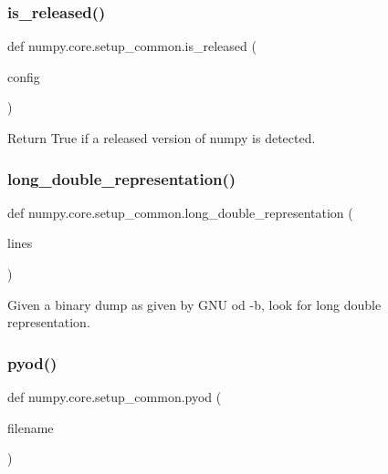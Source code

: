 \subsubsection{\texorpdfstring{is\+\_\+released()}{is\_released()}}
{\footnotesize\ttfamily def numpy.\+core.\+setup\+\_\+common.\+is\+\_\+released (\begin{DoxyParamCaption}\item[{}]{config }\end{DoxyParamCaption})}

\begin{DoxyVerb}Return True if a released version of numpy is detected.\end{DoxyVerb}
 \mbox{\label{namespacenumpy_1_1core_1_1setup__common_ae7eb2d6700eb4a26ef4b33012b9e2457}} 
\subsubsection{\texorpdfstring{long\+\_\+double\+\_\+representation()}{long\_double\_representation()}}
{\footnotesize\ttfamily def numpy.\+core.\+setup\+\_\+common.\+long\+\_\+double\+\_\+representation (\begin{DoxyParamCaption}\item[{}]{lines }\end{DoxyParamCaption})}

\begin{DoxyVerb}Given a binary dump as given by GNU od -b, look for long double
representation.\end{DoxyVerb}
 \mbox{\label{namespacenumpy_1_1core_1_1setup__common_a0335ac177730cff9e8260538e7cb4ec5}} 
\subsubsection{\texorpdfstring{pyod()}{pyod()}}
{\footnotesize\ttfamily def numpy.\+core.\+setup\+\_\+common.\+pyod (\begin{DoxyParamCaption}\item[{}]{filename }\end{DoxyParamCaption})}

